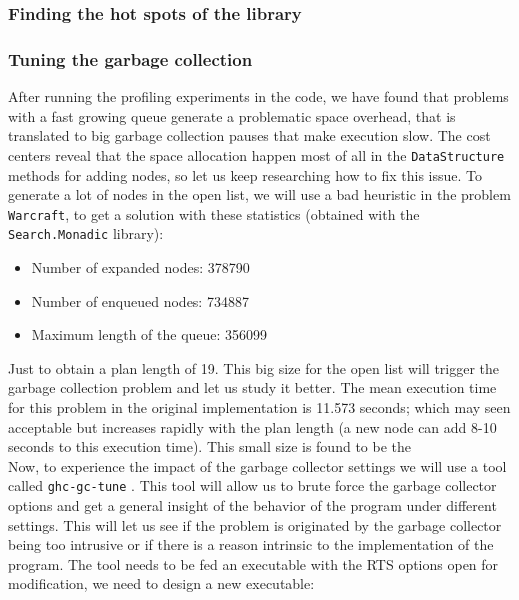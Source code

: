 \subsubsection{Finding the hot spots of the library}



\subsubsection{Tuning the garbage collection}

After running the profiling experiments in the code, we have found that
problems with a fast growing queue generate a problematic space overhead, that
is translated to big garbage collection pauses that make execution slow. The
cost centers reveal that the space allocation happen most of all in the
\texttt{DataStructure} methods for adding nodes, so let us keep researching how
to fix this issue. To generate a lot of nodes in the open list, we will use a
bad heuristic in the problem \texttt{Warcraft}, to get a solution with these
statistics (obtained with the \texttt{Search.Monadic} library):

\begin{itemize}
 \item Number of expanded nodes: 378790
 \item Number of enqueued nodes: 734887
 \item Maximum length of the queue: 356099
\end{itemize}

Just to obtain a plan length of 19. This big size for the open list will
trigger the garbage collection problem and let us study it better. The mean
execution time for this problem in the original implementation is 11.573
seconds; which may seen acceptable but increases rapidly with the plan length
(a new node can add 8-10 seconds to this execution time). This small size is
found to be the \\

Now, to experience the impact of the garbage collector settings we will use a
tool called \texttt{ghc-gc-tune} \cite{ghc-gc-tune}. This tool will allow us to
brute force the garbage collector options and get a general insight of the
behavior of the program under different settings. This will let us see if the
problem is originated by the garbage collector being too intrusive or if there
is a reason intrinsic to the implementation of the program. The tool needs to
be fed an executable with the RTS options open for modification, we need to
design a new executable:\\

